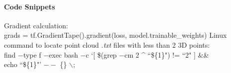 \paragraph{Code Snippets}\label{sec:code-snippets}

\begin{outline}
    \1 Gradient calculation:\\grads = tf.GradientTape().gradient(loss, model.trainable\_weights)
    \1 Linux command to locate point cloud \textit{.txt} files with less than 2 3D points:\\find $-$type f $-$exec bash $-$c `[ \$(grep $-$cm 2 \^{} ``\$\{1\}") != ``2" ] \&\&\\echo ``\$\{1\}"' $--$ \{\} $\backslash$;
\end{outline}
